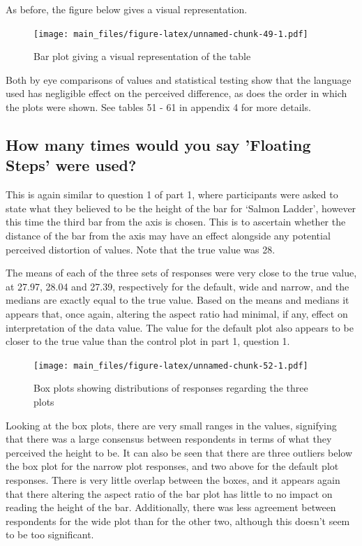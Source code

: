 \documentclass[
  11pt,
]{book}
\begin{document}
As before, the figure below gives a visual representation.

\begin{figure}
\centering
\texttt{[image: main\_files/figure-latex/unnamed-chunk-49-1.pdf]}
\caption{Bar plot giving a visual representation of the table}
\end{figure}

Both by eye comparisons of values and statistical testing show that the
language used has negligible effect on the perceived difference, as does
the order in which the plots were shown. See tables 51 - 61 in appendix
4 for more details.

\subsection{How many times would you say 'Floating Steps' were used?}

This is again similar to question 1 of part 1, where participants were
asked to state what they believed to be the height of the bar for
`Salmon Ladder', however this time the third bar from the axis is
chosen. This is to ascertain whether the distance of the bar from the
axis may have an effect alongside any potential perceived distortion of
values. Note that the true value was 28.

The means of each of the three sets of responses were very close to the
true value, at 27.97, 28.04 and 27.39, respectively for the default,
wide and narrow, and the medians are exactly equal to the true value.
Based on the means and medians it appears that, once again, altering the
aspect ratio had minimal, if any, effect on interpretation of the data
value. The value for the default plot also appears to be closer to the
true value than the control plot in part 1, question 1.

\begin{figure}
\centering
\texttt{[image: main\_files/figure-latex/unnamed-chunk-52-1.pdf]}
\caption{Box plots showing distributions of responses regarding the
three plots}
\end{figure}

Looking at the box plots, there are very small ranges in the values,
signifying that there was a large consensus between respondents in terms
of what they perceived the height to be. It can also be seen that there
are three outliers below the box plot for the narrow plot responses, and
two above for the default plot responses. There is very little overlap
between the boxes, and it appears again that there altering the aspect
ratio of the bar plot has little to no impact on reading the height of
the bar. Additionally, there was less agreement between respondents for
the wide plot than for the other two, although this doesn't seem to be
too significant.
\end{document}
